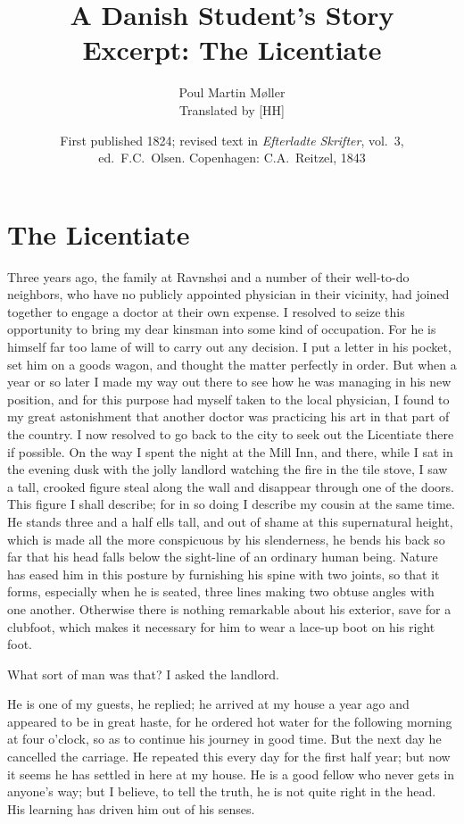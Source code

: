 \documentclass[12pt]{article}
\title{\textbf{A Danish Student's Story}\\[0.5em]
  \large Excerpt: The Licentiate}
\author{Poul Martin Møller\\[0.4em]
  \small Translated by [HH]}
\date{First published 1824; revised text in
  \textit{Efterladte Skrifter}, vol.~3,\\
  ed.\ F.C.\ Olsen. Copenhagen: C.A.\ Reitzel, 1843}
\begin{document}
\maketitle

\section*{The Licentiate}

\noindent
Three years ago, the family at Ravnshøi and a number of their
well-to-do neighbors, who have no publicly appointed physician in
their vicinity, had joined together to engage a doctor at their own
expense. I resolved to seize this opportunity to bring my dear
kinsman into some kind of occupation. For he is himself far too lame
of will to carry out any decision. I put a letter in his pocket, set
him on a goods wagon, and thought the matter perfectly in order. But
when a year or so later I made my way out there to see how he was
managing in his new position, and for this purpose had myself taken
to the local physician, I found to my great astonishment that another
doctor was practicing his art in that part of the country. I now
resolved to go back to the city to seek out the Licentiate there if
possible. On the way I spent the night at the Mill Inn, and there,
while I sat in the evening dusk with the jolly landlord watching the
fire in the tile stove, I saw a tall, crooked figure steal along the
wall and disappear through one of the doors. This figure I shall
describe; for in so doing I describe my cousin at the same time. He
stands three and a half ells tall, and out of shame at this
supernatural height, which is made all the more conspicuous by his
slenderness, he bends his back so far that his head falls below the
sight-line of an ordinary human being. Nature has eased him in this
posture by furnishing his spine with two joints, so that it forms,
especially when he is seated, three lines making two obtuse angles
with one another. Otherwise there is nothing remarkable about his
exterior, save for a clubfoot, which makes it necessary for him to
wear a lace-up boot on his right foot.

What sort of man was that? I asked the landlord.

He is one of my guests, he replied; he arrived at my house a year
ago and appeared to be in great haste, for he ordered hot water for
the following morning at four o'clock, so as to continue his journey
in good time. But the next day he cancelled the carriage. He repeated
this every day for the first half year; but now it seems he has
settled in here at my house. He is a good fellow who never gets in
anyone's way; but I believe, to tell the truth, he is not quite right
in the head. His learning has driven him out of his senses.
\end{document}

